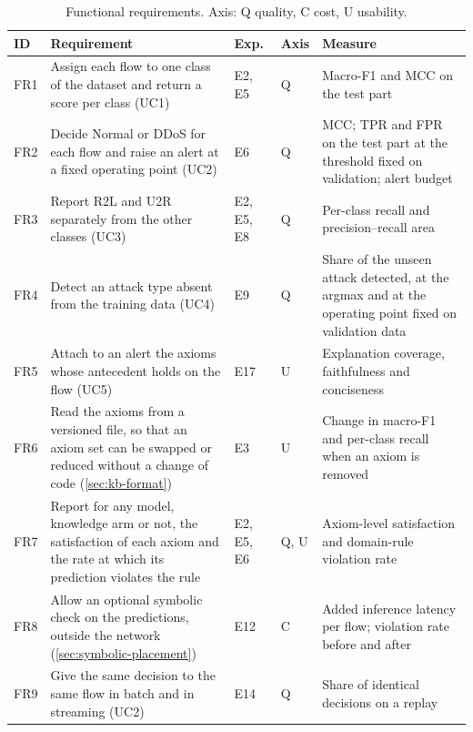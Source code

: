 \begin{table}[t]
\centering
\footnotesize
\caption{Functional requirements. Axis: Q quality, C cost, U usability.}
\label{tab:functional-requirements}
\setlength{\tabcolsep}{4pt}
\begin{tabular}{@{}p{1cm}p{5.5cm}p{1.2cm}p{0.7cm}p{4.2cm}@{}}
\toprule
ID & Requirement & Exp. & Axis & Measure \\
\midrule
FR1 & Assign each flow to one class of the dataset and return a score per class (UC1)
  & E2, E5 & Q & Macro-F1 and MCC on the test part \\
FR2 & Decide Normal or DDoS for each flow and raise an alert at a fixed operating point (UC2)
  & E6 & Q & MCC; TPR and FPR on the test part at the threshold fixed on validation; alert budget \\
FR3 & Report R2L and U2R separately from the other classes (UC3)
  & E2, E5, E8 & Q & Per-class recall and precision--recall area \\
FR4 & Detect an attack type absent from the training data (UC4)
  & E9 & Q & Share of the unseen attack detected, at the argmax and at the operating point fixed on validation data \\
FR5 & Attach to an alert the axioms whose antecedent holds on the flow (UC5)
  & E17 & U & Explanation coverage, faithfulness and conciseness \\
FR6 & Read the axioms from a versioned file, so that an axiom set can be swapped or reduced without a change of code (\cref{sec:kb-format})
  & E3 & U & Change in macro-F1 and per-class recall when an axiom is removed \\
FR7 & Report for any model, knowledge arm or not, the satisfaction of each axiom and the rate at which its prediction violates the rule
  & E2, E5, E6 & Q, U & Axiom-level satisfaction and domain-rule violation rate \\
FR8 & Allow an optional symbolic check on the predictions, outside the network (\cref{sec:symbolic-placement})
  & E12 & C & Added inference latency per flow; violation rate before and after \\
FR9 & Give the same decision to the same flow in batch and in streaming (UC2)
  & E14 & Q & Share of identical decisions on a replay \\
\bottomrule
\end{tabular}
\end{table}

